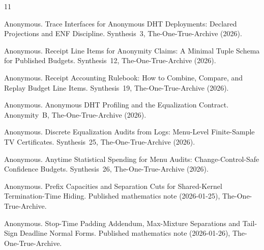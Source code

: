 \documentclass[11pt]{article}
\begin{document}

\begin{thebibliography}{11}

Anonymous.
\newblock Trace Interfaces for Anonymous DHT Deployments: Declared Projections and ENF Discipline.
\newblock Synthesis~3, The-One-True-Archive (2026).

Anonymous.
\newblock Receipt Line Items for Anonymity Claims: A Minimal Tuple Schema for Published Budgets.
\newblock Synthesis~12, The-One-True-Archive (2026).

Anonymous.
\newblock Receipt Accounting Rulebook: How to Combine, Compare, and Replay Budget Line Items.
\newblock Synthesis~19, The-One-True-Archive (2026).

Anonymous.
\newblock Anonymous DHT Profiling and the Equalization Contract.
\newblock Anonymity~B, The-One-True-Archive (2026).

Anonymous.
\newblock Discrete Equalization Audits from Logs: Menu-Level Finite-Sample TV Certificates.
\newblock Synthesis~25, The-One-True-Archive (2026).

Anonymous.
\newblock Anytime Statistical Spending for Menu Audits: Change-Control-Safe Confidence Budgets.
\newblock Synthesis~26, The-One-True-Archive (2026).

Anonymous.
\newblock Prefix Capacities and Separation Cuts for Shared-Kernel Termination-Time Hiding.
\newblock Published mathematics note (2026-01-25), The-One-True-Archive.

Anonymous.
\newblock Stop-Time Padding Addendum, Max-Mixture Separations and Tail-Sign Deadline Normal Forms.
\newblock Published mathematics note (2026-01-26), The-One-True-Archive.

\end{thebibliography}
\end{document}
